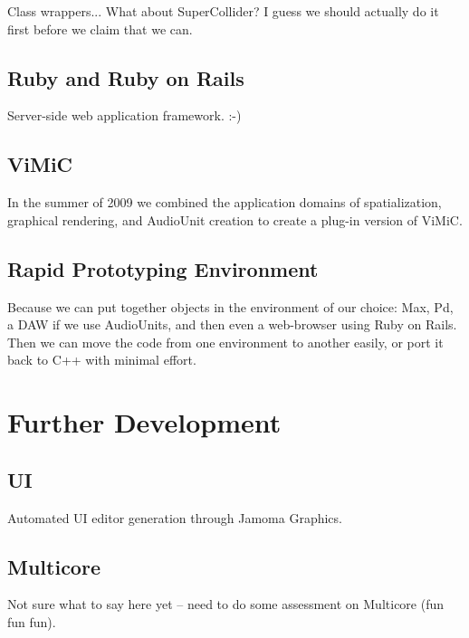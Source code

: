 \documentclass[twoside,10pt]{article}
\begin{document}
Class wrappers...  What about SuperCollider?  I guess we should actually do it first before we claim that we can.

\subsection{Ruby and Ruby on Rails}

Server-side web application framework.  :-)

\subsection{ViMiC}
In the summer of 2009 we combined the application domains of spatialization, graphical rendering, and AudioUnit creation to create a plug-in version of ViMiC\cite{Peters:2008b}.


\subsection{Rapid Prototyping Environment}

Because we can put together objects in the environment of our choice: Max, Pd, a DAW if we use AudioUnits, and then even a web-browser using Ruby on Rails.  Then we can move the code from one environment to another easily, or port it back to C++ with minimal effort.



\section{Further Development} %

\subsection{UI}

Automated UI editor generation through Jamoma Graphics.

\subsection{Multicore}

Not sure what to say here yet -- need to do some assessment on Multicore (fun fun fun).
\end{document}
